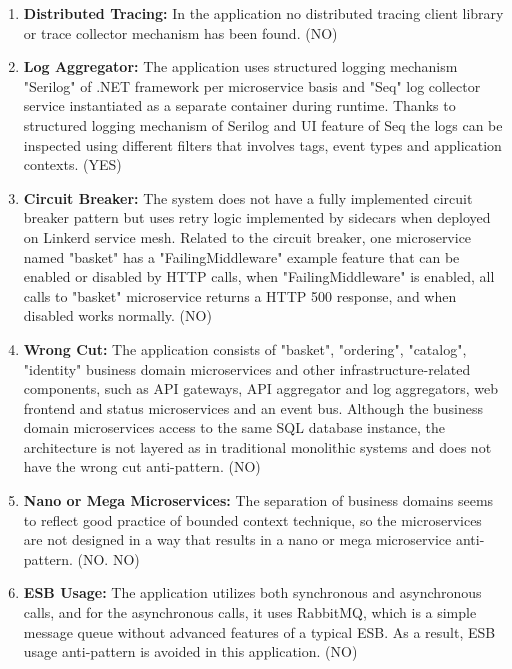 \documentclass{Configuration_Files/PoliMi3i_thesis}
\begin{document}
\begin{enumerate}
    \item \textbf{Distributed Tracing:} In the application no distributed tracing client library or trace collector mechanism has been found. (NO)
    
    \item \textbf{Log Aggregator:} The application uses structured logging mechanism "Serilog" of .NET framework per microservice basis and "Seq" log collector service instantiated as a separate container during runtime.
    Thanks to structured logging mechanism of Serilog and UI feature of Seq the logs can be inspected using different filters that involves tags, event types and application contexts. (YES)
    
    \item \textbf{Circuit Breaker:} The system does not have a fully implemented circuit breaker pattern but uses retry logic implemented by sidecars when deployed on Linkerd service mesh.
    Related to the circuit breaker, one microservice named "basket" has a "FailingMiddleware" example feature that can be enabled or disabled by HTTP calls, when "FailingMiddleware" is enabled, all calls to "basket" microservice returns a HTTP 500 response, and when disabled works normally. (NO)
    
    \item \textbf{Wrong Cut:} The application consists of "basket", "ordering", "catalog", "identity" business domain microservices and other infrastructure-related components, such as API gateways, API aggregator and log aggregators, web frontend and status microservices and an event bus.
    Although the business domain microservices access to the same SQL database instance, the architecture is not layered as in traditional monolithic systems and does not have the wrong cut anti-pattern. (NO)
    
    \item \textbf{Nano or Mega Microservices:} The separation of business domains seems to reflect good practice of bounded context technique, so the microservices are not designed in a way that results in a nano or mega microservice anti-pattern. (NO. NO)
    
    \item \textbf{ESB Usage:} The application utilizes both synchronous and asynchronous calls, and for the asynchronous calls, it uses RabbitMQ, which is a simple message queue without advanced features of a typical ESB.
    As a result, ESB usage anti-pattern is avoided in this application. (NO)
    

\end{enumerate}
\end{document}
